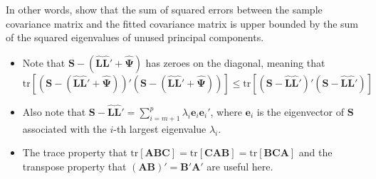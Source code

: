 \documentclass[
  letterpaper,
  DIV=11,
  numbers=noendperiod]{scrartcl}
\providecommand{\tightlist}{%
  \setlength{\itemsep}{0pt}\setlength{\parskip}{0pt}}\usepackage{longtable,booktabs,array}
\begin{document}
In other words, show that the sum of squared errors between the sample
covariance matrix and the fitted covariance matrix is upper bounded by
the sum of the squared eigenvalues of unused principal components.

\begin{itemize}
\tightlist
\item
  Note that
  \(\mathbf{S}-(\hat{\mathbf{L}}\hat{\mathbf{L}}' + \hat{\mathbf{\Psi}})\)
  has zeroes on the diagonal, meaning that
  \(\mathrm{tr}[(\mathbf{S}-(\hat{\mathbf{L}}\hat{\mathbf{L}}' + \hat{\mathbf{\Psi}}))'(\mathbf{S}-(\hat{\mathbf{L}}\hat{\mathbf{L}}' + \hat{\mathbf{\Psi}}))]\leq \mathrm{tr}[(\mathbf{S}-\hat{\mathbf{L}}\hat{\mathbf{L}}')'(\mathbf{S}-\hat{\mathbf{L}}\hat{\mathbf{L}}')]\)
\item
  Also note that
  \(\mathbf{S}-\hat{\mathbf{L}}\hat{\mathbf{L}}'=\sum_{i=m+1}^p\lambda_i\mathbf{e}_i\mathbf{e}_i'\),
  where \(\mathbf{e}_i\) is the eigenvector of \(\mathbf{S}\) associated
  with the \(i\)-th largest eigenvalue \(\lambda_i\).
\item
  The trace property that
  \(\mathrm{tr}[\mathbf{A}\mathbf{B}\mathbf{C}]=\mathrm{tr}[\mathbf{C}\mathbf{A}\mathbf{B}]=\mathrm{tr}[\mathbf{B}\mathbf{C}\mathbf{A}]\)
  and the transpose property that
  \((\mathbf{A}\mathbf{B})'=\mathbf{B}'\mathbf{A}'\) are useful here.
\end{itemize}
\end{document}
